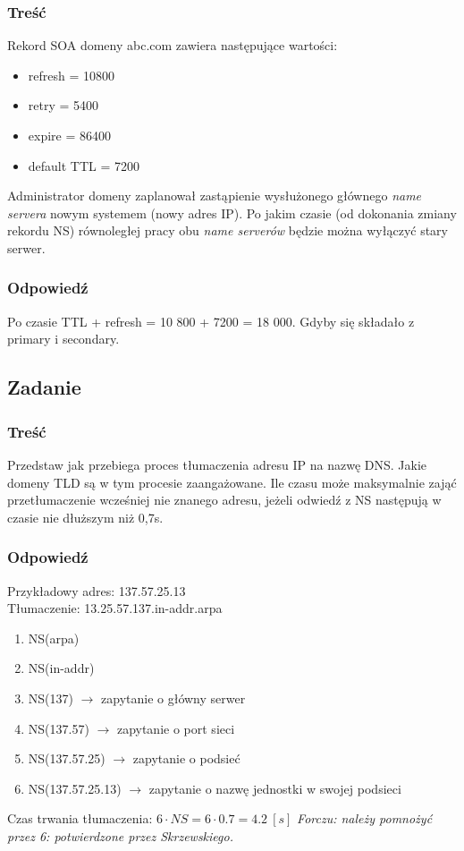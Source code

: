 \documentclass[a4paper,twoside]{article}
\begin{document}
\subsubsection{Treść}
Rekord SOA domeny abc.com zawiera następujące wartości:
\begin{itemize}
	\item refresh = 10800
	\item retry = 5400
	\item expire = 86400
	\item default TTL = 7200
\end{itemize}
Administrator domeny zaplanował zastąpienie wysłużonego głównego \emph{name servera} nowym systemem (nowy adres IP). Po jakim czasie (od dokonania zmiany rekordu NS) równoległej pracy obu \emph{name serverów} będzie można wyłączyć stary serwer.
\subsubsection{Odpowiedź}	
Po czasie TTL + refresh = 10 800 + 7200 = 18 000. Gdyby się składało z primary i secondary.
\newpage
\subsection{Zadanie}
\subsubsection{Treść}
Przedstaw jak przebiega proces tłumaczenia adresu IP na nazwę DNS. Jakie domeny TLD są w tym procesie zaangażowane. Ile czasu może maksymalnie zająć przetłumaczenie wcześniej nie znanego adresu, jeżeli odwiedź z NS następują w czasie nie dłuższym niż 0,7s.
\subsubsection{Odpowiedź}
Przykładowy adres: 137.57.25.13\\
Tłumaczenie: 13.25.57.137.in-addr.arpa
\begin{enumerate}
	\item NS(arpa)
	\item NS(in-addr)
	\item NS(137) $ \rightarrow $ zapytanie o główny serwer
	\item NS(137.57) $ \rightarrow $ zapytanie o port sieci
	\item NS(137.57.25) $ \rightarrow $ zapytanie o podsieć
	\item NS(137.57.25.13) $ \rightarrow $ zapytanie o nazwę jednostki w swojej podsieci
\end{enumerate}
Czas trwania tłumaczenia: $ 6\cdot NS=6\cdot0.7=4.2\:[s] $
{\small \emph{Forczu: należy pomnożyć przez 6: potwierdzone przez Skrzewskiego.}}
\end{document}
